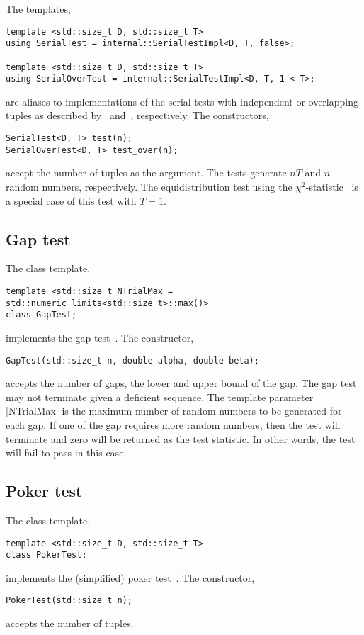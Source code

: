 The templates,
\begin{Verbatim}
template <std::size_t D, std::size_t T>
using SerialTest = internal::SerialTestImpl<D, T, false>;

template <std::size_t D, std::size_t T>
using SerialOverTest = internal::SerialTestImpl<D, T, 1 < T>;
\end{Verbatim}
are aliases to implementations of the serial tests with independent or
overlapping tuples as described by~\cite[pp.~62]{Knuth:1997us}
and~\cite[ex.~24, pp.~78]{Knuth:1997us}, respectively. The constructors,
\begin{Verbatim}
SerialTest<D, T> test(n);
SerialOverTest<D, T> test_over(n);
\end{Verbatim}
accept the number of tuples as the argument. The tests generate $nT$ and $n$
random numbers, respectively. The equidistribution test using the
$\chi^2$-statistic~\cite[pp.~61]{Knuth:1997us} is a special case of this test
with $T = 1$.

\subsection{Gap test}
\label{sub:Gap test}

The class template,
\begin{Verbatim}
template <std::size_t NTrialMax = std::numeric_limits<std::size_t>::max()>
class GapTest;
\end{Verbatim}
implements the gap test~\cite[pp.~62]{Knuth:1997us}. The constructor,
\begin{Verbatim}
GapTest(std::size_t n, double alpha, double beta);
\end{Verbatim}
accepts the number of gaps, the lower and upper bound of the gap. The gap test
may not terminate given a deficient sequence. The template parameter
|NTrialMax| is the maximum number of random numbers to be generated for each
gap. If one of the gap requires more random numbers, then the test will
terminate and zero will be returned as the test statistic. In other words, the
test will fail to pass in this case.

\subsection{Poker test}
\label{sub:Poker test}

The class template,
\begin{Verbatim}
template <std::size_t D, std::size_t T>
class PokerTest;
\end{Verbatim}
implements the (simplified) poker test~\cite[pp.~63]{Knuth:1997us}. The
constructor,
\begin{Verbatim}
PokerTest(std::size_t n);
\end{Verbatim}
accepts the number of tuples.


